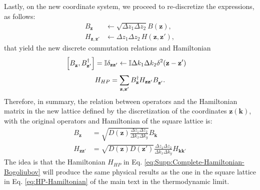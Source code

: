 \documentclass[english,aps,prd,nofootinbib,twocolumn]{revtex4-1}
\begin{document}
Lastly, on the new coordinate system, we proceed to re-discretize the expressions, as follows:
\begin{equation}
\begin{split}
    B_{\mathbf{z}} &\leftarrow \sqrt{\Delta z_{1}\Delta z_{2}} 
    B(\mathbf{z}),
    \\
    H_{\mathbf{z },\mathbf{z'}} &\leftarrow \Delta z_{1}\Delta z_{2} \,
    H(\mathbf{z},\mathbf{z'}),
\end{split}
\end{equation}
that yield the new discrete commutation relations and Hamiltonian
\begin{equation*}
\begin{split}
\left[
B^{\textcolor{white}{\dagger}}_{\mathbf{z }},
B^{\textcolor{black}{\dagger}}_{\mathbf{z'}}
\right] &= 
\mathbb{I} \delta_{\mathbf{zz'}} 
\leftarrow \mathbb{I} 
\Delta k_{1} \Delta k_{2}  
\delta^{2}(\mathbf{z-z'})
\end{split}
\end{equation*}
\begin{equation}
\label{eq:Supp:Complete-Hamiltonian-Bogoliubov}
H_{HP} = \sum_{\mathbf{z},\mathbf{z'}}
B_{\mathbf{z }}^{\textcolor{black}{\dagger}}
H_{\mathbf{z }\mathbf{z'}}
B_{\mathbf{z'}}^{\textcolor{white}{\dagger}}.
\end{equation}
Therefore, in summary, the relation between operators and the Hamiltonian matrix in the new lattice defined by the discretization of the coordinates $\mathbf{z}(\mathbf{k})$, with the original operators and Hamiltonian of the square lattice is:
\begin{equation}
\label{eq:Supp:Lattice-transformations}
\begin{split}
B_{\mathbf{z}} &= \sqrt{D(\mathbf{z})\frac{\Delta z_{1}\Delta z_{2}}{\Delta k_{x}\Delta k_{y}}} 
B_{\mathbf{k}}  \\
H_{\mathbf{z }\mathbf{z'}} &= \sqrt{D(\mathbf{z })D(\mathbf{z'})}
\frac{\Delta z_{1}\Delta z_{2}}{\Delta k_{x}\Delta k_{y}}
H_{\mathbf{k }\mathbf{k'}}
\end{split}
\end{equation}
The idea is that the Hamiltonian $H_{HP}$ in Eq. \eqref{eq:Supp:Complete-Hamiltonian-Bogoliubov} will produce the same physical results as the one in the square lattice in Eq. \eqref{eq:HP-Hamiltonian} of the main text in the thermodynamic limit.
\end{document}
